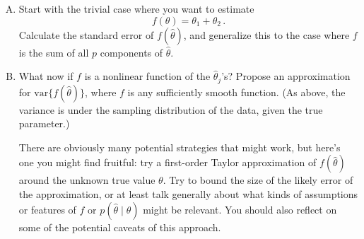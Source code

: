 \documentclass{mynotes}
\newcommand{\thetahat}{\hat{\theta}}
\begin{document}
\begin{enumerate}[(A)]
\item Start with the trivial case where you want to estimate
$$
f(\theta) = \theta_1 + \theta_2 \, .
$$
Calculate the standard error of $f(\thetahat)$, and generalize this to the case where $f$ is the sum of all $p$ components of $\thetahat$.

\item What now if $f$ is a nonlinear function of the $\thetahat_j$'s?  Propose an approximation for $\mbox{var} \{ f(\thetahat) \}$, where $f$ is any sufficiently smooth function.  (As above, the variance is under the sampling distribution of the data, given the true parameter.)

There are obviously many potential strategies that might work, but here's one you might find fruitful: try a first-order Taylor approximation of $f(\thetahat)$ around the unknown true value $\theta$.  Try to bound the size of the likely error of the approximation, or at least talk generally about what kinds of assumptions or features of $f$ or $p(\thetahat \mid \theta)$ might be relevant.  You should also reflect on some of the potential caveats of this approach.

\end{enumerate}
\end{document}
